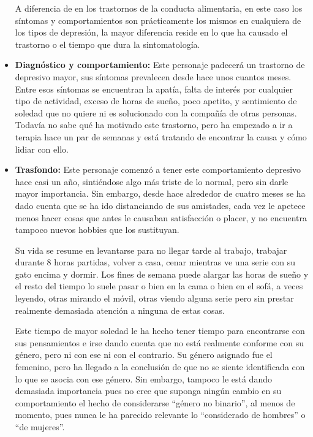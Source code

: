 \documentclass[12pt, a4paper,twoside,titlepage]{book}
\begin{document}
\begin{itemize}
{    A diferencia de en los trastornos de la conducta alimentaria, en este caso los síntomas y comportamientos son prácticamente los mismos en cualquiera de los tipos de depresión, la mayor diferencia reside en lo que ha causado el trastorno o el tiempo que dura la sintomatología. 
    }
    \item {\textbf{Diagnóstico y comportamiento:}
    Este personaje padecerá un trastorno de depresivo mayor, sus síntomas prevalecen desde hace unos cuantos meses. Entre esos síntomas se encuentran la apatía, falta de interés por cualquier tipo de actividad, exceso de horas de sueño, poco apetito, y sentimiento de soledad que no quiere ni es solucionado con la compañía de otras personas. Todavía no sabe qué ha motivado este trastorno, pero ha empezado a ir a terapia hace un par de semanas y está tratando de encontrar la causa y cómo lidiar con ello. 
     }
    \item {\textbf{Trasfondo:} Este personaje comenzó a tener este comportamiento depresivo hace casi un año, sintiéndose algo más triste de lo normal, pero sin darle mayor importancia. Sin embargo, desde hace alrededor de cuatro meses se ha dado cuenta que se ha ido distanciando de sus amistades, cada vez le apetece menos hacer cosas que antes le causaban satisfacción o placer, y no encuentra tampoco nuevos hobbies que los sustituyan. 
    
Su vida se resume en levantarse para no llegar tarde al trabajo, trabajar durante 8 horas partidas, volver a casa, cenar mientras ve una serie con su gato encima y dormir. Los fines de semana puede alargar las horas de sueño y el resto del tiempo lo suele pasar o bien en la cama o bien en el sofá, a veces leyendo, otras mirando el móvil, otras viendo alguna serie pero sin prestar realmente demasiada atención a ninguna de estas cosas. 

Este tiempo de mayor soledad le ha hecho tener tiempo para encontrarse con sus pensamientos e irse dando cuenta que no está realmente conforme con su género, pero ni con ese ni con el contrario. Su género asignado fue el femenino, pero ha llegado a la conclusión de que no se siente identificada con lo que se asocia con ese género. Sin embargo, tampoco le está dando demasiada importancia pues no cree que suponga ningún cambio en su comportamiento el hecho de considerarse ``género no binario'', al menos de momento, pues nunca le ha parecido relevante lo ``considerado de hombres'' o ``de mujeres''. 

}
\end{itemize}
\end{document}
